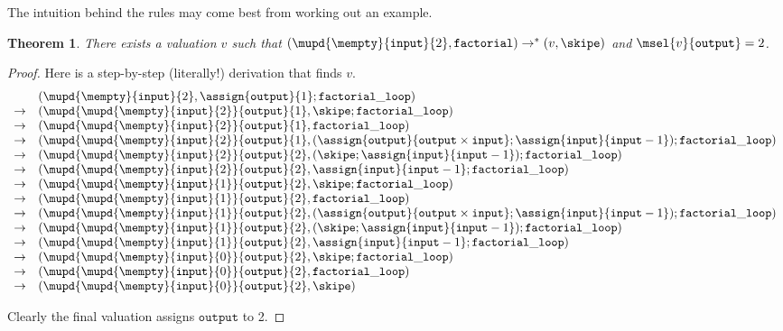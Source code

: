 \documentclass{amsbook}
\newtheorem{theorem}{Theorem}[chapter]
\theoremstyle{definition}
\theoremstyle{remark}
\numberwithin{section}{chapter}
\numberwithin{equation}{chapter}
\begin{document}
The intuition behind the rules may come best from working out an example.

\newcommand{\smallsteps}[2]{#1 \to^* #2}

\begin{theorem}
  There exists a valuation $v$ such that $\smallsteps{(\mupd{\mempty}{\mathtt{input}}{2}, \mathtt{factorial})}{(v, \skipe)}$ and $\msel{v}{\mathtt{output}} = 2$.
\end{theorem}

\begin{proof}
  Here is a step-by-step (literally!) derivation that finds $v$.
  $$\begin{array}{cl}
    & (\mupd{\mempty}{\mathtt{input}}{2}, \assign{\mathtt{output}}{1}; \mathtt{factorial\_loop}) \\
    \to & (\mupd{\mupd{\mempty}{\mathtt{input}}{2}}{\mathtt{output}}{1}, \skipe; \mathtt{factorial\_loop}) \\
    \to & (\mupd{\mupd{\mempty}{\mathtt{input}}{2}}{\mathtt{output}}{1}, \mathtt{factorial\_loop}) \\
    \to & (\mupd{\mupd{\mempty}{\mathtt{input}}{2}}{\mathtt{output}}{1}, (\assign{\mathtt{output}}{\mathtt{output} \times \mathtt{input}}; \assign{\mathtt{input}}{\mathtt{input} - 1}); \mathtt{factorial\_loop}) \\
    \to & (\mupd{\mupd{\mempty}{\mathtt{input}}{2}}{\mathtt{output}}{2}, (\skipe; \assign{\mathtt{input}}{\mathtt{input} - 1}); \mathtt{factorial\_loop}) \\
    \to & (\mupd{\mupd{\mempty}{\mathtt{input}}{2}}{\mathtt{output}}{2}, \assign{\mathtt{input}}{\mathtt{input} - 1}; \mathtt{factorial\_loop}) \\
    \to & (\mupd{\mupd{\mempty}{\mathtt{input}}{1}}{\mathtt{output}}{2}, \skipe; \mathtt{factorial\_loop}) \\
    \to & (\mupd{\mupd{\mempty}{\mathtt{input}}{1}}{\mathtt{output}}{2}, \mathtt{factorial\_loop}) \\
    \to & (\mupd{\mupd{\mempty}{\mathtt{input}}{1}}{\mathtt{output}}{2}, (\assign{\mathtt{output}}{\mathtt{output} \times \mathtt{input}}; \assign{\mathtt{input}}{\mathtt{input} - 1}); \mathtt{factorial\_loop}) \\
    \to & (\mupd{\mupd{\mempty}{\mathtt{input}}{1}}{\mathtt{output}}{2}, (\skipe; \assign{\mathtt{input}}{\mathtt{input} - 1}); \mathtt{factorial\_loop}) \\
    \to & (\mupd{\mupd{\mempty}{\mathtt{input}}{1}}{\mathtt{output}}{2}, \assign{\mathtt{input}}{\mathtt{input} - 1}; \mathtt{factorial\_loop}) \\
    \to & (\mupd{\mupd{\mempty}{\mathtt{input}}{0}}{\mathtt{output}}{2}, \skipe; \mathtt{factorial\_loop}) \\
    \to & (\mupd{\mupd{\mempty}{\mathtt{input}}{0}}{\mathtt{output}}{2}, \mathtt{factorial\_loop}) \\
    \to & (\mupd{\mupd{\mempty}{\mathtt{input}}{0}}{\mathtt{output}}{2}, \skipe)
  \end{array}$$

  Clearly the final valuation assigns $\mathtt{output}$ to 2.
\end{proof}
\end{document}
